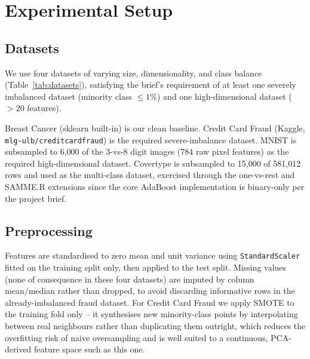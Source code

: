 \documentclass[conference]{IEEEtran}
\begin{document}
\section{Experimental Setup}
\label{sec:experiments}

\subsection{Datasets}
We use four datasets of varying size, dimensionality, and class balance
(Table~\ref{tab:datasets}), satisfying the brief's requirement of at least one
severely imbalanced dataset (minority class $\leq 1\%$) and one high-dimensional
dataset ($>20$ features).

\begin{table}[t]
\caption{Dataset summary}
\label{tab:datasets}
\centering
\small
{}
\end{table}

Breast Cancer (sklearn built-in) is our clean baseline. Credit Card Fraud
(Kaggle, \texttt{mlg-ulb/creditcardfraud}) is the required severe-imbalance
dataset. MNIST is subsampled to 6{,}000 of the 3-vs-8 digit images (784 raw
pixel features) as the required high-dimensional dataset. Covertype is
subsampled to 15{,}000 of 581{,}012 rows and used as the multi-class
dataset, exercised through the one-vs-rest and SAMME.R extensions since the
core AdaBoost implementation is binary-only per the project brief.

\subsection{Preprocessing}
Features are standardised to zero mean and unit variance using
\texttt{StandardScaler} fitted on the training split only, then applied to the
test split. Missing values (none of consequence in these four datasets) are
imputed by column mean/median rather than dropped, to avoid discarding
informative rows in the already-imbalanced fraud dataset. For Credit Card
Fraud we apply SMOTE \cite{chawla2002smote} to the training fold only -- it
synthesises new minority-class points by interpolating between real
neighbours rather than duplicating them outright, which reduces the
overfitting risk of naive oversampling and is well suited to a continuous,
PCA-derived feature space such as this one.
\end{document}
